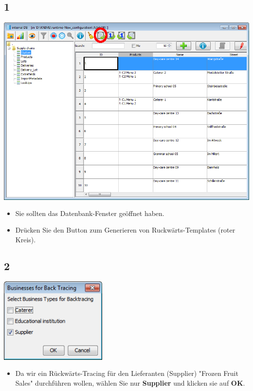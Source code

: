 \documentclass{beamer}
\begin{document}
\subsection{1}
\begin{frame}
	\begin{center}
  		\includegraphics[height=0.6\textheight]{1.png}
	\end{center}
	\begin{itemize}
		\item Sie sollten das Datenbank-Fenster geöffnet haben.
		\item Drücken Sie den Button zum Generieren von Ruckwärts-Templates (roter Kreis).
	\end{itemize}
\end{frame}

\subsection{2}
\begin{frame}
	\begin{center}
  		\includegraphics[width=0.4\textwidth]{2.png}
	\end{center}
	\begin{itemize}
		\item Da wir ein Rückwärts-Tracing für den Lieferanten (Supplier) "Frozen Fruit Sales" durchführen wollen, wählen Sie nur \textbf{Supplier} und klicken sie auf \textbf{OK}.
	\end{itemize}
\end{frame}
\end{document}
